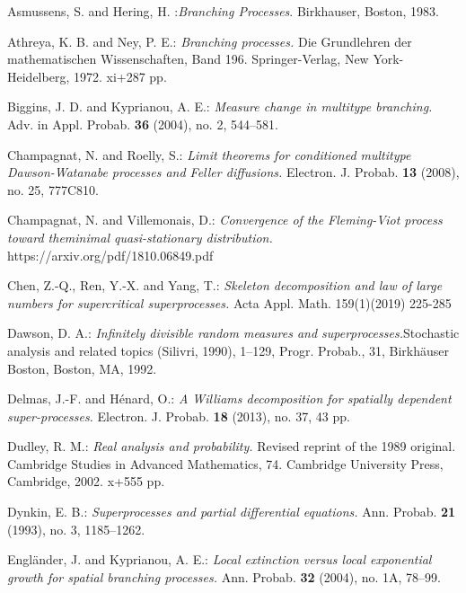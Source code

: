 \documentclass[12pt,a4paper]{amsart}
\numberwithin{equation}{section}
\theoremstyle{plain}
\theoremstyle{definition}
\theoremstyle{remark}
\begin{document}
\begin{thebibliography}{99}
	
Asmussens, S. and Hering, H. :\emph{Branching Processes}. Birkhauser, Boston, 1983.

Athreya, K. B. and Ney, P. E.:
\emph{Branching processes.}
Die Grundlehren der mathematischen Wissenschaften, Band 196. Springer-Verlag, New York-Heidelberg, 1972. xi+287 pp.

Biggins, J. D. and Kyprianou, A. E.:
\emph{Measure change in multitype branching.}
Adv. in Appl. Probab. \textbf{36} (2004), no. 2, 544--581.

Champagnat, N. and Roelly, S.:
\emph{Limit theorems for conditioned multitype Dawson-Watanabe processes and Feller diffusions.}
Electron. J. Probab. \textbf{13} (2008), no. 25, 777C810.

Champagnat, N. and Villemonais, D.:
\emph{Convergence of the Fleming-Viot process toward
theminimal quasi-stationary distribution.}
https://arxiv.org/pdf/1810.06849.pdf

Chen, Z.-Q., Ren, Y.-X. and Yang, T.:
\emph{Skeleton decomposition and law of large numbers for supercritical superprocesses.}
Acta Appl. Math. 159(1)(2019) 225-285

Dawson, D. A.:
\emph{Infinitely divisible random measures and superprocesses.}Stochastic analysis and related topics (Silivri, 1990), 1--129,
Progr. Probab., 31, Birkh{\"a}user Boston, Boston, MA, 1992.

Delmas, J.-F. and H\'enard, O.:
\emph{A Williams decomposition for spatially dependent super-processes. }
Electron. J. Probab. \textbf{18} (2013), no. 37, 43 pp.

Dudley, R. M.:
\emph{Real analysis and probability.}
Revised reprint of the 1989 original. Cambridge Studies in Advanced Mathematics, 74. Cambridge University Press, Cambridge, 2002. x+555 pp.

Dynkin, E. B.:
\emph{Superprocesses and partial differential equations.}
Ann. Probab. \textbf{21} (1993), no. 3, 1185--1262.

Engl\"ander, J. and Kyprianou, A. E.:
\emph{Local extinction versus local exponential growth for spatial branching processes.}
Ann. Probab. \textbf{32} (2004), no. 1A, 78--99.


\end{thebibliography}
\end{document}
